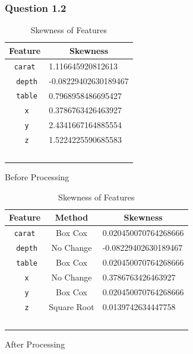 \documentclass[11pt,letterpaper]{article}
\begin{document}
\subsubsection*{Question 1.2}
\begin{table}[H]
    \begin{subtable}[H]{0.45\textwidth}
    \centering
    \begin{tabular}{c l}
        \hline
        Feature & \multicolumn{1}{c}{Skewness} \\
        \hline
        \texttt{carat} & 1.116645920812613  \\ \
        \texttt{depth} & -0.08229402630189467 \\ \
        \texttt{table} &  0.7968958486695427\\ \
        \texttt{x} & 0.3786763426463927  \\ \
       \texttt{y} & 2.4341667164885554  \\ \
        \texttt{z} & 1.5224225590685583  \\ \
    \end{tabular}
    \caption{Before Processing}
    \end{subtable}
    \begin{subtable}[H]{0.45\textwidth}
        \centering
        \begin{tabular}{c c l}
            \hline
            Feature & Method & \multicolumn{1}{c}{Skewness} \\
            \hline
            \texttt{carat} & Box Cox & 0.020450070764268666 \\ \
            \texttt{depth} & No Change & -0.08229402630189467 \\ \
            \texttt{table} &  Box Cox & 0.020450070764268666\\ \
            \texttt{x} & No Change & 0.3786763426463927  \\ \
           \texttt{y} & Box Cox & 0.020450070764268666  \\ \
            \texttt{z} & Square Root & 0.0139742634447758  \\ \
        \end{tabular}
        \caption{After Processing}
        \end{subtable}
    \caption{Skewness of Features}
\end{table}
\end{document}
